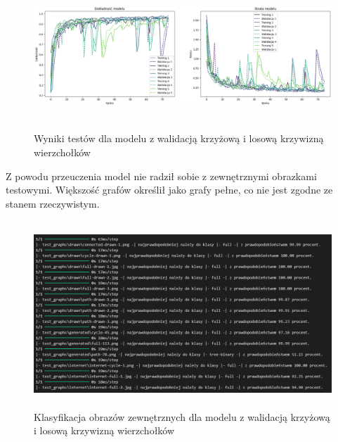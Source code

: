 \begin{figure}[ht]
	\centering
	\includegraphics[height=5.5cm]{resources/tests/images/v3/crossvalid_img.png}
	\caption{Wyniki testów dla modelu z walidacją krzyżową i losową krzywizną wierzchołków}
	\label{Fig:tests-cv-1}
\end{figure}
\FloatBarrier

Z powodu przeuczenia model nie radził sobie z zewnętrznymi obrazkami testowymi.
Większość grafów określił jako grafy pełne, co nie jest zgodne ze stanem rzeczywistym.

\begin{figure}[ht]
	\centering
	\includegraphics[height=7cm]{resources/tests/images/v3/crossvalid_txt.png}
	\caption{Klasyfikacja obrazów zewnętrznych dla modelu z walidacją krzyżową i losową krzywizną wierzchołków}
	\label{Fig:tests-cv-2}
\end{figure}
\FloatBarrier